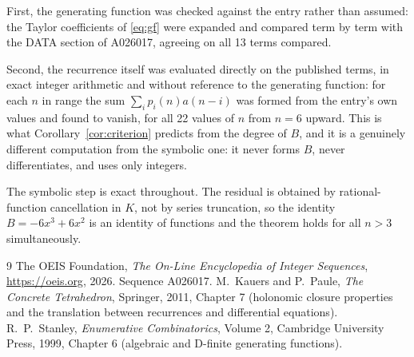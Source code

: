 \documentclass[11pt,a4paper]{article}
\theoremstyle{plain}
\theoremstyle{definition}
\begin{document}
First, the generating function was checked against the entry rather than assumed: the
Taylor coefficients of \eqref{eq:gf} were expanded and compared term by term with the DATA
section of A026017, agreeing on all 13 terms compared.

Second, the recurrence itself was evaluated directly on the published terms, in exact
integer arithmetic and without reference to the generating function: for each $n$ in range
the sum $\sum_{i}p_{i}(n)a(n-i)$ was formed from the entry's own values and found to
vanish, for all 22 values of $n$ from $n=6$ upward. This is what
Corollary~\ref{cor:criterion} predicts from the degree of $B$, and it is a genuinely
different computation from the symbolic one: it never forms $B$, never differentiates, and
uses only integers.

The symbolic step is exact throughout. The residual is obtained by rational-function
cancellation in $K$, not by series truncation, so the identity $B=- 6 x^{3} + 6 x^{2}$ is an
identity of functions and the theorem holds for all $n>3$ simultaneously.

\begin{thebibliography}{9}
 The OEIS Foundation, \emph{The On-Line Encyclopedia of Integer Sequences},
\url{https://oeis.org}, 2026. Sequence A026017.
 M.~Kauers and P.~Paule, \emph{The Concrete Tetrahedron}, Springer, 2011,
Chapter 7 (holonomic closure properties and the translation between recurrences and
differential equations).
 R.~P.~Stanley, \emph{Enumerative Combinatorics}, Volume 2, Cambridge
University Press, 1999, Chapter 6 (algebraic and D-finite generating functions).
\end{thebibliography}
\end{document}
